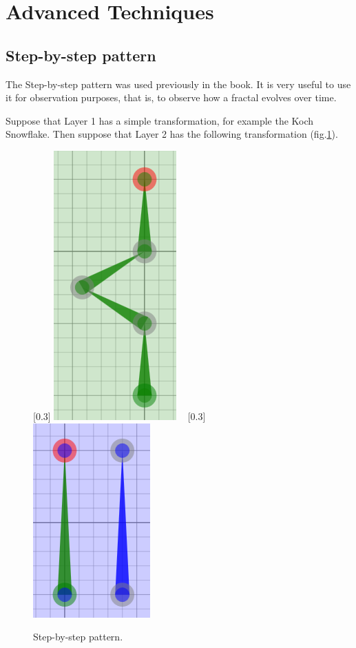 \section{Advanced Techniques}

	\subsection{Step-by-step pattern}

		The Step-by-step pattern was used previously in the book.
		It is very useful to use it for observation purposes, that is, to observe how a fractal evolves over time.
		
	    Suppose that Layer 1 has a simple transformation, for example the Koch Snowflake.
	    Then suppose that Layer 2 has the following transformation (fig.\ref{step_01}).

	    \begin{figure}[H]
	    	\centering
	    	\caption{\label{step_01} Step-by-step pattern.}
	    	[0.3\TW]
                {\includegraphics[height=0.3\TW]{img/Advanced_Techniques/Step/step_set_02.png}}
            ~
            [0.3\TW]
                {\includegraphics[height=0.3\TW]{img/Advanced_Techniques/Step/step_set_01.png}}
	    \end{figure}


